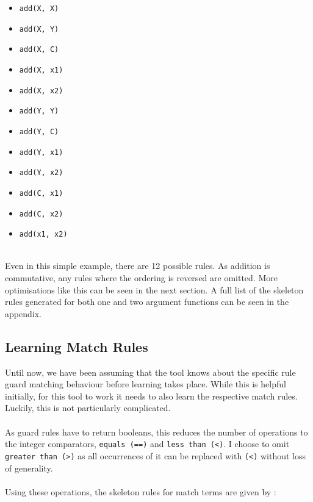 \begin{multicols}{2}
\begin{itemize}
\item \lstinline{add(X, X)}
\item \lstinline{add(X, Y)}
\item \lstinline{add(X, C)}
\item \lstinline{add(X, x1)}
\item \lstinline{add(X, x2)}
\item \lstinline{add(Y, Y)}
\item \lstinline{add(Y, C)}
\item \lstinline{add(Y, x1)}
\item \lstinline{add(Y, x2)}
\item \lstinline{add(C, x1)}
\item \lstinline{add(C, x2)}
\item \lstinline{add(x1, x2)}
\end{itemize}
\end{multicols}
\mbox{}\\
Even in this simple example, there are 12 possible rules. As addition is commutative, any rules where the ordering is reversed are omitted. More optimisations like this can be seen in the next section.
A full list of the skeleton rules generated for both one and two argument functions can be seen in the appendix.

\subsection{Learning Match Rules}
Until now, we have been assuming that the tool knows about the specific rule guard matching behaviour before learning takes place. While this is helpful initially, for this tool to work it needs to also learn the respective match rules. Luckily, this is not particularly complicated. \\ \\
As guard rules have to return booleans, this reduces the number of operations to the integer comparators, \lstinline{equals (==)} and \lstinline{less than (<)}. I choose to omit \lstinline{greater than (>)} as all occurrences of it can be replaced with \lstinline{(<)} without loss of generality.\\ \\
Using these operations, the skeleton rules for match terms are given by : \\

